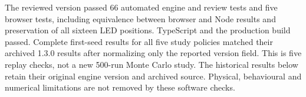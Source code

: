 The reviewed version passed 66 automated engine and review tests and five browser tests, including equivalence between browser and Node results and preservation of all sixteen LED positions. TypeScript and the production build passed. Complete first-seed results for all five study policies matched their archived 1.3.0 results after normalizing only the reported version field. This is five replay checks, not a new 500-run Monte Carlo study. The historical results below retain their original engine version and archived source. Physical, behavioural and numerical limitations are not removed by these software checks.
